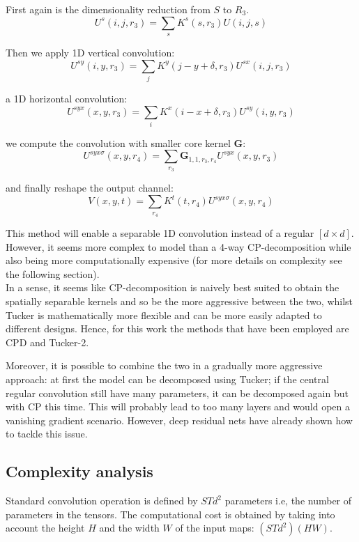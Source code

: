 First again is the dimensionality reduction from $S$ to $R_3$. 
\begin{equation}
    U^s(i,j,r_3) = \sum_s K^s(s, r_3) U(i,j,s)
\end{equation}

Then we apply 1D vertical convolution: 
\begin{equation}
        U^{sy}(i,y,r_3) = \sum_j K^y(j-y+\delta, r_3) U^{sx}(i,j,r_3)
\end{equation}

a 1D horizontal convolution: 
\begin{equation}
    U^{syx}(x,y,r_3) = \sum_i K^x(i-x+\delta, r_3) U^{sy}(i,y,r_3)
\end{equation}

we compute the convolution with smaller core kernel $\mathbf{G}$:
\begin{equation}
U^{syx\sigma}(x,y,r_4) = \sum_{r_3} \mathbf{G}_{1,1,r_3,r_4} U^{syx}(x,y,r_3)
\end{equation}

and finally reshape the output channel:
\begin{equation}
    V(x, y,t) = \sum_{r_4} K^t(t, r_4)U^{syx\sigma}(x,y,r_4)
\end{equation}

This method will enable a separable 1D convolution instead of a regular $[d \times d]$. However, it seems more complex to model than a 4-way CP-decomposition while also being more computationally expensive (for more details on complexity see the following section). \\
In a sense, it seems like CP-decomposition is naively best suited to obtain the spatially separable kernels and so be the more aggressive between the two, whilst Tucker is mathematically more flexible and can be more easily adapted to different designs. Hence, for this work the methods that have been employed are CPD and Tucker-2. 
\newline 

Moreover, it is possible to combine the two in a gradually more aggressive approach: at first the model can be decomposed using Tucker; if the central regular convolution still have many parameters, it can be decomposed again but with CP this time. This will probably lead to too many layers and would open a vanishing gradient scenario. However, deep residual nets\parencite{resnet} have already shown how to tackle this issue. 


\pagebreak
\subsection{Complexity analysis}
\label{subsec:complexity}
Standard convolution operation is defined by $STd^2$ parameters i.e, the number of parameters in the tensors. The computational cost is obtained by taking into account the height $H$ and the width $W$ of the input maps: $(STd^2)(HW)$. 

